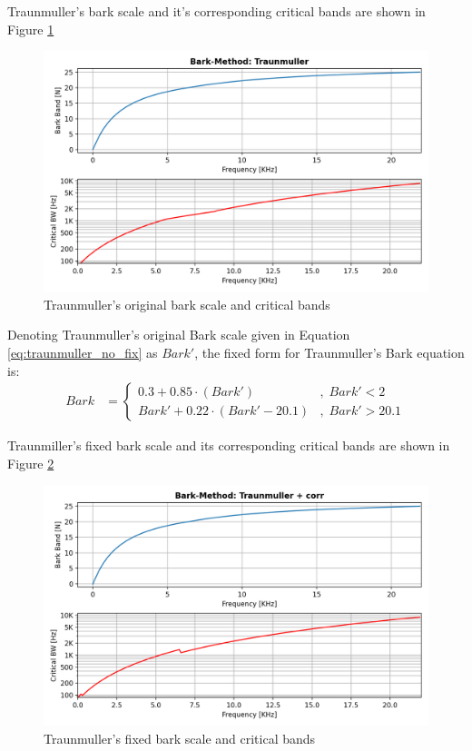 Traunmuller's bark scale and it's corresponding critical bands
are shown in Figure \ref{fig:Traunmuller_nofix}
\begin{figure}[H]
    \centering
    \includegraphics[width=0.75\linewidth]{Experiments/images/Traunmuller_nofix}
    \caption{Traunmuller's original bark scale and critical bands}\label{fig:Traunmuller_nofix}
\end{figure}

Denoting Traunmuller's original
Bark scale given in Equation \ref{eq:traunmuller_no_fix} as \(Bark'\),
the fixed form for Traunmuller's Bark equation is:
\begin{align}
    Bark & = \begin{cases}
        0.3 + 0.85\cdot \left( Bark' \right) 
        &,\;Bark' < 2 \\
        Bark' + 0.22\cdot \left( Bark' - 20.1 \right) 
        &,\;Bark' > 20.1
    \end{cases}
\end{align}

Traunmiller's fixed bark scale and its corresponding critical bands
are shown in Figure \ref{fig:Traunmuller_fix}
\begin{figure}[H]
    \centering
    \includegraphics[width=0.75\linewidth]{Experiments/images/Traunmuller_fix}
    \caption{Traunmuller's fixed bark scale and critical bands}\label{fig:Traunmuller_fix}
\end{figure}

